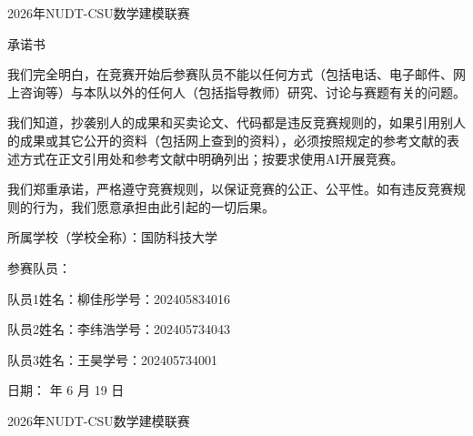 \documentclass[UTF8,a4paper,12pt]{ctexart}
\numberwithin{figure}{section}
\numberwithin{table}{section}
\newcommand{\fronttitle}[1]{\begin{center}{\songti\zihao{-2}#1}\end{center}}
\begin{document}
\pagestyle{plain}

\thispagestyle{empty}

\begin{center}
  {\songti{}2026年NUDT-CSU数学建模联赛}

  \vspace{0.8cm}
  {\songti{}承\quad 诺\quad 书}
\end{center}

\vspace{0.8cm}

我们完全明白，在竞赛开始后参赛队员不能以任何方式（包括电话、电子邮件、网上咨询等）与本队以外的任何人（包括指导教师）研究、讨论与赛题有关的问题。

我们知道，抄袭别人的成果和买卖论文、代码都是违反竞赛规则的，如果引用别人的成果或其它公开的资料（包括网上查到的资料），必须按照规定的参考文献的表述方式在正文引用处和参考文献中明确列出；按要求使用AI开展竞赛。

我们郑重承诺，严格遵守竞赛规则，以保证竞赛的公正、公平性。如有违反竞赛规则的行为，我们愿意承担由此引起的一切后果。

\vspace{1.2cm}

\noindent 所属学校（学校全称）：国防科技大学

\vspace{0.6cm}

\noindent 参赛队员：

\vspace{0.4cm}

\noindent 队员1姓名：柳佳彤\quad 学号：202405834016

\vspace{0.4cm}

\noindent 队员2姓名：李纬浩\quad 学号：202405734043

\vspace{0.4cm}

\noindent 队员3姓名：王昊\quad 学号：202405734001

\vfill

\begin{flushright}
日期： 年 6 月 19 日
\end{flushright}

\clearpage

\thispagestyle{empty}

\fronttitle{2026年NUDT-CSU数学建模联赛}
\end{document}
